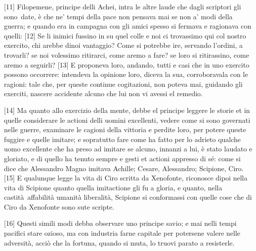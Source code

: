 {[}11{]} Filopemene, principe delli Achei, intra le altre laude che
dagli scriptori gli sono\est\ date, è che ne' tempi della pace non pensava
mai se non a' modi della guerra; e quando era in campagna con gli amici
spesso si fermava e ragionava con quelli: {[}12{]} Se li inimici fussino
in su quel colle e noi ci trovassimo qui col nostro exercito, chi arebbe
dinoi vantaggio? Come si potrebbe ire, servando l'ordini, a trovarli? se
noi volessimo ritirarci, come aremo a fare? se loro si ritirassino, come
aremo a seguirli? {[}13{]} E proponeva loro, andando, tutti e casi che
in uno exercito possono occorrere: intendeva la opinione loro, diceva la
sua, corroboravala con le ragioni: tale che, per queste continue
cogitazioni, non poteva mai, guidando gli exerciti, nascere accidente
alcuno che lui non vi avessi el remedio.

{[}14{]} Ma quanto allo exercizio della mente, debbe el principe leggere
le storie et in quelle considerare le actioni delli uomini excellenti,
vedere come si sono governati nelle guerre, examinare le cagioni della
vittoria e perdite loro, per potere queste fuggire e quelle imitare; e
sopratutto fare come ha fatto per lo adrieto qualche uomo excellente che
ha preso ad imitare se alcuno, innanzi a lui, è stato laudato e
gloriato, e di quello ha tenuto sempre e gesti et actioni appresso di
sé: come si dice che Alessandro Magno imitava Achille; Cesare,
Alessandro; Scipione, Ciro. {[}15{]} E qualunque legge la vita di Ciro
scritta da Xenofonte, riconosce dipoi nella vita di Scipione quanto
quella imitactione gli fu a gloria, e quanto, nella castità\est\ affabilità
umanità liberalità, Scipione si conformassi con quelle cose che di Ciro
da Xenofonte sono sute scripte.

{[}16{]} Questi simili modi debba observare uno principe savio; e mai
nelli tempi pacifici stare ozioso, ma con industria farne capitale per
potersene valere nelle adversità, acciò che la fortuna, quando si muta,
lo truovi parato a resisterle.


